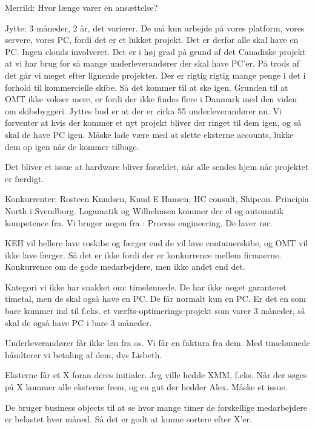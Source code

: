 \begin{linenumbers*}
Merrild:
Hvor længe varer en ansættelse?

Jytte:
3 måneder, 2 år, det varierer. De må kun arbejde på vores platform, 
vores servere, vores PC, fordi det er et lukket projekt.
Det er derfor alle skal have en PC. Ingen clouds involveret.
Det er i høj grad på grund af det Canadiske projekt
at vi har brug for så mange underleverandører der skal have PC’er. 
På trods af det går vi meget efter lignende projekter.
Der er rigtig rigtig mange penge i det i forhold til kommercielle skibe.
Så det kommer til at ske igen.
Grunden til at OMT ikke vokser mere, er fordi der ikke findes flere i Danmark
med den viden om skibsbyggeri. 
Jyttes bud er at der er cirka 55 underleverandører nu.
Vi forventer at hvis der kommer et nyt projekt bliver der ringet til dem igen,
og så skal de have PC igen.
Måske lade være med at slette eksterne accounts,
lukke dem op igen når de kommer tilbage.

Det bliver et issue at hardware bliver forældet,
når alle sendes hjem når projektet er færdigt.

Konkurrenter:
Rosteen Knudsen, Knud E Hansen, HC consult, Shipcon. Principia North i Svendborg. 
Logamatik og Wilhelmsen kommer der el og automatik kompetence fra.
Vi bruger nogen fra : Process engineering. De laver rør.

KEH vil hellere lave roskibe og færger end de vil lave containerskibe,
og OMT vil ikke lave færger. Så det er ikke fordi der er konkurrence mellem
firmaerne. 
Konkurrence om de gode medarbejdere, men ikke andet end det.

Kategori vi ikke har snakket om: timelønnede.
De har ikke noget garanteret timetal, men de skal også have en PC.
De får normalt kun en PC. Er det en som bare kommer ind til f.eks.
et værfts-optimerings-projekt som varer 3 måneder,
så skal de også have PC i bare 3 måneder.

Underleverandører får ikke løn fra os. Vi får en faktura fra dem. 
Med timelønnede håndterer vi betaling af dem, dvs Lisbeth.

Eksterne får et X foran deres initialer. Jeg ville hedde XMM, f.eks.
Når der søges på X kommer alle eksterne frem, og en gut der hedder Alex.
Måske et issue.

De bruger business objects til at se hvor mange timer
de forskellige medarbejdere er belastet hver måned.
Så det er godt at kunne sortere efter X’er.
\end{linenumbers*}